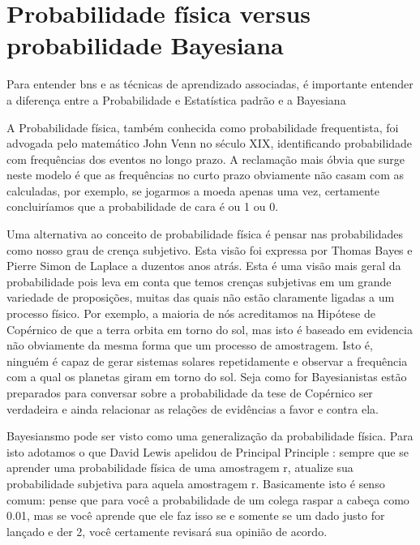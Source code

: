 \section{Probabilidade física versus probabilidade Bayesiana}
Para entender \glspl{bn} e as técnicas de aprendizado associadas, é importante entender a diferença entre a Probabilidade e Estatística padrão e a Bayesiana \cite{korb04}


A Probabilidade física, também conhecida como probabilidade frequentista, foi advogada pelo matemático John Venn \cite{venn66} no século XIX, identificando probabilidade com frequências dos eventos no longo prazo. A reclamação mais óbvia que surge neste modelo é que as frequências no curto prazo obviamente não casam com as calculadas, por exemplo, se jogarmos a moeda apenas uma vez, certamente concluiríamos que a probabilidade de cara é ou 1 ou 0.

Uma alternativa ao conceito de probabilidade física é pensar nas probabilidades como nosso grau de crença subjetivo. Esta visão foi expressa por Thomas Bayes \cite{bayes63} e Pierre Simon de Laplace \cite{laplace12} a duzentos anos atrás. Esta é uma visão mais geral da probabilidade pois leva em conta que temos crenças subjetivas em um grande variedade de proposições, muitas das quais não estão claramente ligadas a um processo físico.  Por exemplo, a maioria de nós acreditamos na Hipótese de Copérnico de que a terra orbita em torno do sol, mas isto é baseado em evidencia não obviamente da mesma forma que um processo de amostragem. Isto é, ninguém é capaz de gerar sistemas solares repetidamente e observar a frequência com a qual os planetas giram em torno do sol. Seja como for Bayesianistas estão preparados para conversar sobre a probabilidade da tese de Copérnico ser verdadeira e ainda relacionar as relações de evidências a favor e contra ela. 

Bayesiansmo pode ser visto como uma generalização da probabilidade física. Para isto adotamos o que David Lewis apelidou de Principal Principle \cite{lewis80}: sempre que se aprender uma probabilidade física de uma amostragem r, atualize sua probabilidade subjetiva para aquela amostragem r. Basicamente isto é senso comum: pense que para você a  probabilidade de um colega raspar a cabeça como 0.01, mas se você aprende que ele faz isso se e somente se um dado justo for lançado e der 2, você certamente revisará sua opinião de acordo.

